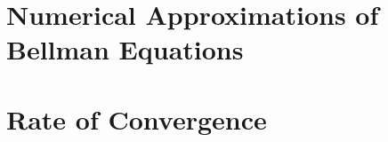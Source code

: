 \documentclass[12pt]{article}
\newcommand{\dge}[1]{\textcolor{blue}{$^{\textrm{dge}}${#1}}}
\newcommand{\tjs}[1]{\textcolor{red}{$^{\textrm{tjs}}${#1}}}
\begin{document}
%




\begin{appendix}
 \section{Numerical Approximations of Bellman Equations\label{sec:app_numerical}}

 \section{Rate of Convergence\label{sec:app_convergence}}

\end{appendix}

%



\end{document}

